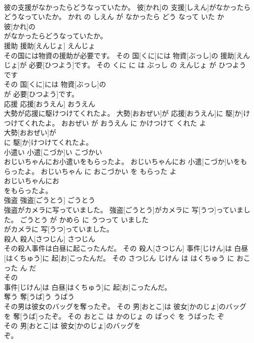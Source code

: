 \documentclass[8pt]{extreport}
\begin{document}
\begin{CJK}{UTF8}{min}
\\	彼の支援がなかったらどうなっていたか。	彼[かれ]の 支援[しえん]がなかったらどうなっていたか。	かれ の しえん が なかったら どう なって いた か	
\\	彼[かれ]の
\\	がなかったらどうなっていたか。			
\\	援助	援助[えんじょ]	えんじょ	
\\	その国には物資の援助が必要です。	その 国[くに]には 物資[ぶっし]の 援助[えんじょ]が 必要[ひつよう]です。	その くに に は ぶっし の えんじょ が ひつよう です	
\\	その 国[くに]には 物資[ぶっし]の
\\	が 必要[ひつよう]です。			
\\	応援	応援[おうえん]	おうえん	
\\	大勢が応援に駆けつけてくれたよ。	大勢[おおぜい]が 応援[おうえん]に 駆[か]けつけてくれたよ。	おおぜい が おうえん に かけつけて くれた よ	
\\	大勢[おおぜい]が
\\	に 駆[か]けつけてくれたよ。			
\\	小遣い	小遣[こづか]い	こづかい	
\\	おじいちゃんにお小遣いをもらったよ。	おじいちゃんにお 小遣[こづか]いをもらったよ。	おじいちゃん に おこづかい を もらった よ	
\\	おじいちゃんにお
\\	をもらったよ。			
\\	強盗	強盗[ごうとう]	ごうとう	
\\	強盗がカメラに写っていました。	強盗[ごうとう]がカメラに 写[うつ]っていました。	ごうとう が かめら に うつって いました	
\\	がカメラに 写[うつ]っていました。			
\\	殺人	殺人[さつじん]	さつじん	
\\	その殺人事件は白昼に起こったんだ。	その 殺人[さつじん] 事件[じけん]は 白昼[はくちゅう]に 起[お]こったんだ。	その さつじん じけん は はくちゅう に おこった ん だ	
\\	その
\\	事件[じけん]は 白昼[はくちゅう]に 起[お]こったんだ。			
\\	奪う	奪[うば]う	うばう	
\\	その男は彼女のバッグを奪ったぞ。	その 男[おとこ]は 彼女[かのじょ]のバッグを 奪[うば]ったぞ。	その おとこ は かのじょ の ばっぐ を うばった ぞ	
\\	その 男[おとこ]は 彼女[かのじょ]のバッグを
\\	ぞ。			

\end{CJK}
\end{document}
